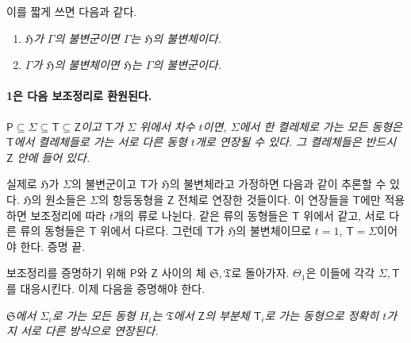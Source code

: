 이를 짧게 쓰면 다음과 같다.

\begin{enumerate}
\item \emph{\(\mathfrak H\)가 \(\Gamma\)의 불변군이면 \(\Gamma\)는 \(\mathfrak H\)의 불변체이다.}
\item \emph{\(\Gamma\)가 \(\mathfrak H\)의 불변체이면 \(\mathfrak H\)는 \(\Gamma\)의 불변군이다.}
\end{enumerate}

\paragraph{1은 다음 보조정리로 환원된다.}

\emph{\(\mathsf P\subseteq\Sigma\subseteq\mathsf T\subseteq\mathsf Z\)이고 \(\mathsf T\)가 \(\Sigma\) 위에서 차수 \(t\)이면, \(\Sigma\)에서 한 켤레체로 가는 모든 동형은 \(\mathsf T\)에서 켤레체들로 가는 서로 다른 동형 \(t\)개로 연장될 수 있다. 그 켤레체들은 반드시 \(\mathsf Z\) 안에 들어 있다.}

실제로 \(\mathfrak H\)가 \(\Sigma\)의 불변군이고 \(\mathsf T\)가 \(\mathfrak H\)의 불변체라고 가정하면 다음과 같이 추론할 수 있다. \(\mathfrak H\)의 원소들은 \(\Sigma\)의 항등동형을 \(\mathsf Z\) 전체로 연장한 것들이다. 이 연장들을 \(\mathsf T\)에만 적용하면 보조정리에 따라 \(t\)개의 류로 나뉜다. 같은 류의 동형들은 \(\mathsf T\) 위에서 같고, 서로 다른 류의 동형들은 \(\mathsf T\) 위에서 다르다. 그런데 \(\mathsf T\)가 \(\mathfrak H\)의 불변체이므로 \(t=1\), \(\mathsf T=\Sigma\)이어야 한다. 증명 끝.

보조정리를 증명하기 위해 \(\mathsf P\)와 \(\mathsf Z\) 사이의 체 \(\mathfrak S,\mathfrak T\)로 돌아가자. \(\Theta_1\)은 이들에 각각 \(\Sigma,\mathsf T\)를 대응시킨다. 이제 다음을 증명해야 한다.

\emph{\(\mathfrak S\)에서 \(\Sigma_i\)로 가는 모든 동형 \(H_i\)는 \(\mathfrak T\)에서 \(\mathsf Z\)의 부분체 \(\mathsf T_i\)로 가는 동형으로 정확히 \(t\)가지 서로 다른 방식으로 연장된다.}

